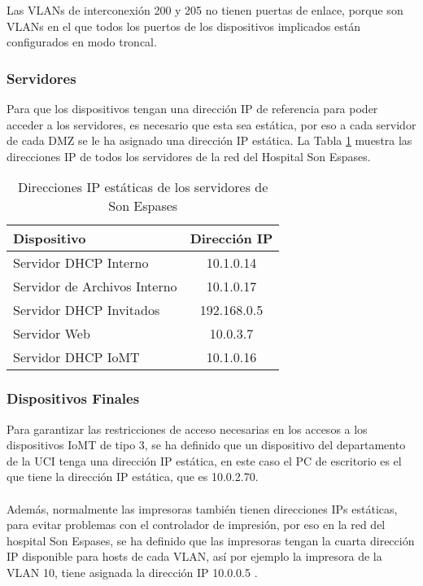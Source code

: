 Las VLANs de interconexión 200 y 205 no tienen puertas de enlace, porque son VLANs en el que todos los puertos de los dispositivos implicados están configurados en modo troncal.

\subsubsection{Servidores}
Para que los dispositivos tengan una dirección IP de referencia para poder acceder a los servidores, es necesario que esta sea estática, por eso a cada servidor de cada DMZ se le ha asignado una dirección IP estática.
La Tabla \ref{tab:servidoresSE} muestra las direcciones IP de todos los servidores de la red del Hospital Son Espases.
\begin{table}[H]
    \centering
    \scriptsize
    \begin{tabular}{|l|c|}
        \hline
        \textbf{Dispositivo} & \textbf{Dirección IP} \\
        \hline
        Servidor DHCP Interno & 10.1.0.14 \\
        \hline
        Servidor de Archivos Interno & 10.1.0.17 \\
        \hline
        Servidor DHCP Invitados & 192.168.0.5 \\
        \hline
        Servidor Web & 10.0.3.7 \\
        \hline
        Servidor DHCP IoMT & 10.1.0.16 \\
        \hline
    \end{tabular}
    \caption{Direcciones IP estáticas de los servidores de Son Espases}
    \label{tab:servidoresSE}
\end{table}

\subsubsection{Dispositivos Finales}
Para garantizar las restricciones de acceso necesarias en los accesos a los dispositivos IoMT de tipo 3, se ha definido que un dispositivo del departamento de la UCI tenga una dirección IP estática, 
en este caso el PC de escritorio es el que tiene la dirección IP estática, que es 10.0.2.70. 
\\ \\
Además, normalmente las impresoras también tienen direcciones IPs estáticas, para evitar problemas con el controlador de impresión, por eso en la red del hospital Son Espases, se ha 
definido que las impresoras tengan la cuarta dirección IP disponible para hosts de cada VLAN, así por ejemplo la impresora de la VLAN 10, tiene asignada la dirección IP 10.0.0.5 \cite{Impresoras}.

